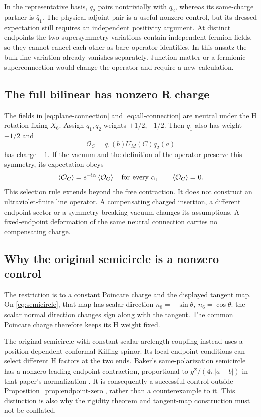 In the representative basis, $q_2$ pairs nontrivially with $\bar q_2$,
whereas its same-charge partner is $\bar q_1$. The physical adjoint
pair is a useful nonzero control, but its dressed expectation still
requires an independent positivity argument. At distinct endpoints
the two supersymmetry variations contain independent fermion fields,
so they cannot cancel each other as bare operator identities. In
this ansatz the bulk line variation already vanishes separately.
Junction matter or a fermionic superconnection would change the
operator and require a new calculation.

\subsection{The full bilinear has nonzero R charge}

The fields in \eqref{eq:plane-connection} and \eqref{eq:all-connection}
are neutral under the H rotation fixing $X_6$. Assign $q_1,q_2$ weights
$+1/2,-1/2$. Then $\bar q_1$ also has weight $-1/2$ and
\begin{equation}\label{eq:charged-bilinear}
 \mathcal O_C=\bar q_1(b)U_M(C)q_2(a)
\end{equation}
has charge $-1$. If the vacuum and the definition of the operator
preserve this symmetry, its expectation obeys
\begin{equation}
 \left\langle\mathcal O_C\right\rangle=e^{-\mathrm i\alpha}\left\langle\mathcal O_C\right\rangle
 \quad\text{for every }\alpha,\qquad\left\langle\mathcal O_C\right\rangle=0.
\end{equation}
This selection rule extends beyond the free contraction. It does not
construct an ultraviolet-finite line operator. A compensating charged
insertion, a different endpoint sector or a symmetry-breaking vacuum
changes its assumptions. A fixed-endpoint deformation of the same
neutral connection carries no compensating charge.

\subsection{Why the original semicircle is a nonzero control}

The restriction is to a constant Poincare charge and the displayed
tangent map. On \eqref{eq:semicircle}, that map has scalar direction
$n_8=-\sin\theta$, $n_6=\cos\theta$: the scalar normal direction
changes sign along with the tangent. The common Poincare charge
therefore keeps its H weight fixed.

The original semicircle with constant scalar arclength coupling instead
uses a position-dependent conformal Killing spinor. Its local endpoint
conditions can select different H factors at the two ends. Baker's
same-polarization semicircle has a nonzero leading endpoint contraction,
proportional to $g^2/(4\pi|a-b|)$ in that paper's normalization
\cite[Section~3.2]{Baker}. It is consequently a successful control
outside Proposition~\ref{prop:endpoint-zero}, rather than a
counterexample to it. This distinction is also why the rigidity theorem
and tangent-map construction must not be conflated.

